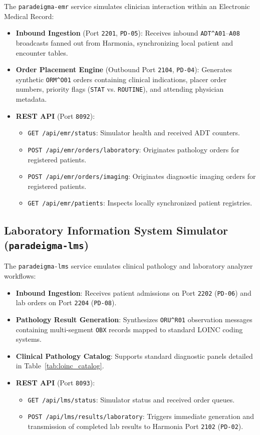 The \texttt{paradeigma-emr} service simulates clinician interaction within an Electronic Medical Record:
\begin{itemize}
    \item \textbf{Inbound Ingestion} (Port \texttt{2201}, \texttt{PD-05}): Receives inbound \texttt{ADT\^{}A01}--\texttt{A08} broadcasts fanned out from Harmonia, synchronizing local patient and encounter tables.
    \item \textbf{Order Placement Engine} (Outbound Port \texttt{2104}, \texttt{PD-04}): Generates synthetic \texttt{ORM\^{}O01} orders containing clinical indications, placer order numbers, priority flags (\texttt{STAT} vs. \texttt{ROUTINE}), and attending physician metadata.
    \item \textbf{REST API} (Port \texttt{8092}):
    \begin{itemize}
        \item \texttt{GET /api/emr/status}: Simulator health and received ADT counters.
        \item \texttt{POST /api/emr/orders/laboratory}: Originates pathology orders for registered patients.
        \item \texttt{POST /api/emr/orders/imaging}: Originates diagnostic imaging orders for registered patients.
        \item \texttt{GET /api/emr/patients}: Inspects locally synchronized patient registries.
    \end{itemize}
\end{itemize}

\subsection{Laboratory Information System Simulator (\texttt{paradeigma-lms})}

The \texttt{paradeigma-lms} service emulates clinical pathology and laboratory analyzer workflows:
\begin{itemize}
    \item \textbf{Inbound Ingestion}: Receives patient admissions on Port \texttt{2202} (\texttt{PD-06}) and lab orders on Port \texttt{2204} (\texttt{PD-08}).
    \item \textbf{Pathology Result Generation}: Synthesizes \texttt{ORU\^{}R01} observation messages containing multi-segment \texttt{OBX} records mapped to standard LOINC coding systems.
    \item \textbf{Clinical Pathology Catalog}: Supports standard diagnostic panels detailed in Table~\ref{tab:loinc_catalog}.
    \item \textbf{REST API} (Port \texttt{8093}):
    \begin{itemize}
        \item \texttt{GET /api/lms/status}: Simulator status and received order queues.
        \item \texttt{POST /api/lms/results/laboratory}: Triggers immediate generation and transmission of completed lab results to Harmonia Port \texttt{2102} (\texttt{PD-02}).
    \end{itemize}
\end{itemize}

